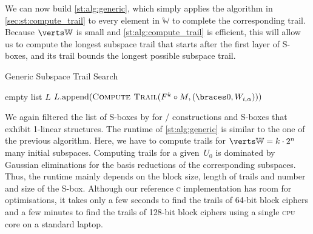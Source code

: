 We can now build \cref{st:alg:generic}, which simply applies the algorithm in \cref{sec:st:compute_trail} to every element in $\mathbb{W}$ to complete the corresponding trail.
Because $\abs{\mathbb{W}}$ is small and \cref{st:alg:compute_trail} is efficient, this will allow us to compute the longest subspace trail that starts after the first layer of S-boxes, and its trail bounds the longest possible subspace trail.
\begin{algorithm}
\caption{Generic Subspace Trail Search}\label{st:alg:generic}
\begin{algorithmic}[1]
    \Statex{}
    \State{}empty list $L$
        \State{}$L.\mathrm{append}(\textsc{Compute Trail}(F^k \circ M, (\set{0}, W_{i,\alpha})))$
    \EndFor{}
    \State{}
    \EndFunction{}
\end{algorithmic}
\end{algorithm}

We again filtered the list of S-boxes by \textcite{PhD:Perrin17} for \SPN/ constructions and S-boxes that exhibit 1-linear structures.
The runtime of \cref{st:alg:generic} is similar to the one of the previous algorithm.
Here, we have to compute trails for $\abs{\mathbb{W}} = k \cdot 2^n$ many initial subspaces.
Computing trails for a given~$U_0$ is dominated by Gaussian eliminations for the basis reductions of the corresponding subspaces.
Thus, the runtime mainly depends on the block size, length of trails and number and size of the S-box.
Although our reference \textsc{c} implementation has room for optimisations, it takes only a few seconds to find the trails of 64-bit block ciphers and a few minutes to find the trails of 128-bit block ciphers using a single \textsc{cpu} core on a standard laptop.

